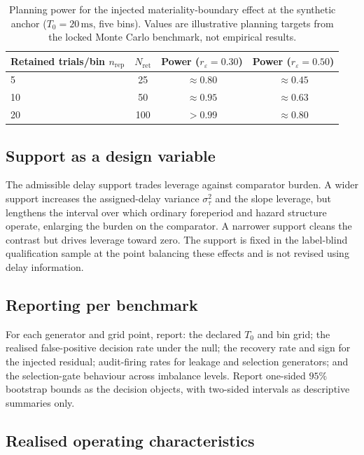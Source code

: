 \documentclass[11pt,a4paper]{article}
\theoremstyle{definition}
\begin{document}
\begin{table}[t]
\centering
\caption{Planning power for the injected materiality-boundary effect at the
synthetic anchor (\(T_0=20\,\mathrm{ms}\), five bins). Values are illustrative
planning targets from the locked Monte Carlo benchmark, not empirical results.}
\label{tab:si-power}
\footnotesize
\begin{tabular}{lccc}
\toprule
Retained trials/bin \(n_{\mathrm{rep}}\) & \(N_{\mathrm{ret}}\) &
Power (\(r_\varepsilon=0.30\)) & Power (\(r_\varepsilon=0.50\)) \\
\midrule
5  & 25  & \(\approx 0.80\) & \(\approx 0.45\) \\
10 & 50  & \(\approx 0.95\) & \(\approx 0.63\) \\
20 & 100 & \(>0.99\)        & \(\approx 0.80\) \\
\bottomrule
\end{tabular}
\end{table}

\subsection{Support as a design variable}
\label{sec:si-support}

The admissible delay support trades leverage against comparator burden. A wider
support increases the assigned-delay variance \(\sigma_\tau^2\) and the slope
leverage, but lengthens the interval over which ordinary foreperiod and hazard
structure operate, enlarging the burden on the comparator. A narrower support
cleans the contrast but drives leverage toward zero. The support is fixed in the
label-blind qualification sample at the point balancing these effects and is not
revised using delay information.

\subsection{Reporting per benchmark}
\label{sec:si-benchmark-reporting}

For each generator and grid point, report: the declared \(T_0\) and bin grid; the
realised false-positive decision rate under the null; the recovery rate and
sign for the injected residual; audit-firing rates for leakage and selection
generators; and the selection-gate behaviour across imbalance levels. Report
one-sided \(95\%\) bootstrap bounds as the decision objects, with two-sided
intervals as descriptive summaries only.

\subsection{Realised operating characteristics}
\label{sec:si-operating}
\end{document}
